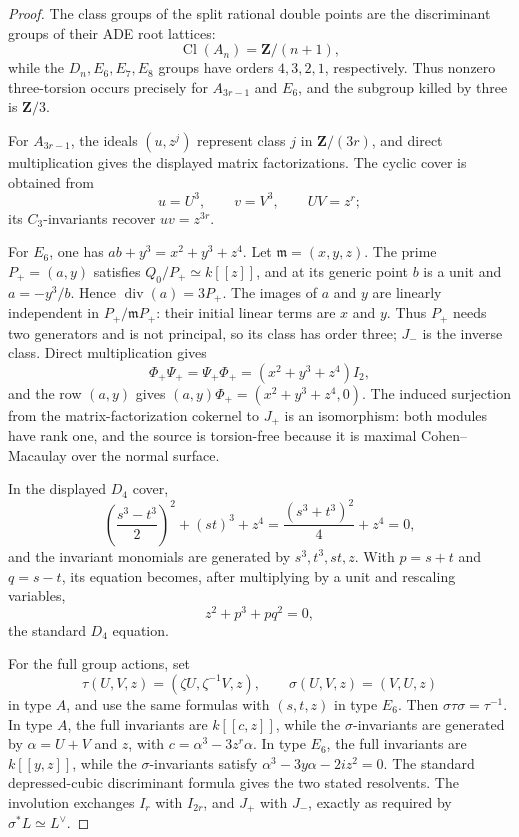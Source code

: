 \begin{proof}
The class groups of the split rational double points are the discriminant
groups of their ADE root lattices:
\[
\operatorname{Cl}(A_n)=\mathbf Z/(n+1),
\]
while the \(D_n,E_6,E_7,E_8\) groups have orders \(4,3,2,1\), respectively.
Thus nonzero three-torsion occurs precisely for \(A_{3r-1}\) and \(E_6\), and
the subgroup killed by three is \(\mathbf Z/3\).

For \(A_{3r-1}\), the ideals \((u,z^j)\) represent class \(j\) in
\(\mathbf Z/(3r)\), and direct multiplication gives the displayed matrix
factorizations.  The cyclic cover is obtained from
\[
u=U^3,\qquad v=V^3,\qquad UV=z^r;
\]
its \(C_3\)-invariants recover \(uv=z^{3r}\).

For \(E_6\), one has \(ab+y^3=x^2+y^3+z^4\).  Let
\(\mathfrak m=(x,y,z)\).  The prime \(P_+=(a,y)\) satisfies
\(Q_0/P_+\simeq k[[z]]\), and at its generic point \(b\) is a unit and
\(a=-y^3/b\).  Hence \(\operatorname{div}(a)=3P_+\).  The images of \(a\)
and \(y\) are linearly independent in \(P_+/\mathfrak mP_+\): their initial
linear terms are \(x\) and \(y\).  Thus \(P_+\) needs two generators and is
not principal, so its class has order three; \(J_-\) is the inverse class.
Direct multiplication gives
\[
\Phi_+\Psi_+=\Psi_+\Phi_+=(x^2+y^3+z^4)I_2,
\]
and the row \((a,y)\) gives
\((a,y)\Phi_+=(x^2+y^3+z^4,0)\).  The induced surjection from the
matrix-factorization cokernel to \(J_+\) is an isomorphism: both modules have
rank one, and the source is torsion-free because it is maximal
Cohen--Macaulay over the normal surface.

In the displayed \(D_4\) cover,
\[
\left(\frac{s^3-t^3}{2}\right)^2+(st)^3+z^4
 =\frac{(s^3+t^3)^2}{4}+z^4=0,
\]
and the invariant monomials are generated by \(s^3,t^3,st,z\).  With
\(p=s+t\) and \(q=s-t\), its equation becomes, after multiplying by a unit
and rescaling variables,
\[
z^2+p^3+pq^2=0,
\]
the standard \(D_4\) equation.

For the full group actions, set
\[
\tau(U,V,z)=(\zeta U,\zeta^{-1}V,z),\qquad
\sigma(U,V,z)=(V,U,z)
\]
in type \(A\), and use the same formulas with \((s,t,z)\) in type \(E_6\).
Then \(\sigma\tau\sigma=\tau^{-1}\).  In type \(A\), the full invariants are
\(k[[c,z]]\), while the \(\sigma\)-invariants are generated by
\(\alpha=U+V\) and \(z\), with
\(c=\alpha^3-3z^r\alpha\).  In type \(E_6\), the full invariants are
\(k[[y,z]]\), while the \(\sigma\)-invariants satisfy
\(\alpha^3-3y\alpha-2iz^2=0\).  The standard depressed-cubic discriminant
formula gives the two stated resolvents.  The involution exchanges
\(I_r\) with \(I_{2r}\), and \(J_+\) with \(J_-\), exactly as required by
\(\sigma^*L\simeq L^\vee\).
\end{proof}

